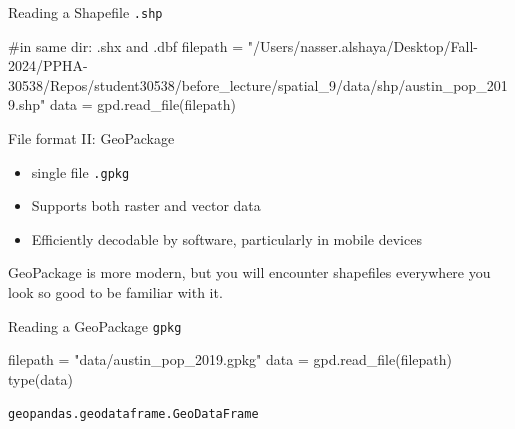 \documentclass[
  ignorenonframetext,
]{beamer}
\newenvironment{Shaded}{\begin{snugshade}}{\end{snugshade}}
\newcommand{\BuiltInTok}[1]{\textcolor[rgb]{0.00,0.23,0.31}{#1}}
\newcommand{\CommentTok}[1]{\textcolor[rgb]{0.37,0.37,0.37}{#1}}
\newcommand{\NormalTok}[1]{\textcolor[rgb]{0.00,0.23,0.31}{#1}}
\newcommand{\OperatorTok}[1]{\textcolor[rgb]{0.37,0.37,0.37}{#1}}
\newcommand{\StringTok}[1]{\textcolor[rgb]{0.13,0.47,0.30}{#1}}
\providecommand{\tightlist}{%
  \setlength{\itemsep}{0pt}\setlength{\parskip}{0pt}}\usepackage{longtable,booktabs,array}
\begin{document}
\begin{frame}[fragile]{Reading a Shapefile \texttt{.shp}}
\label{reading-a-shapefile-.shp}
\begin{Shaded}
\begin{Highlighting}[]
\CommentTok{\#in same dir:  \textasciigrave{}.shx\textasciigrave{} and \textasciigrave{}.dbf\textasciigrave{}}
\NormalTok{filepath }\OperatorTok{=} \StringTok{"/Users/nasser.alshaya/Desktop/Fall{-}2024/PPHA{-}30538/Repos/student30538/before\_lecture/spatial\_9/data/shp/austin\_pop\_2019.shp"}
\NormalTok{data }\OperatorTok{=}\NormalTok{ gpd.read\_file(filepath)}
\end{Highlighting}
\end{Shaded}
\end{frame}

\begin{frame}[fragile]{File format II: GeoPackage}
\label{file-format-ii-geopackage}
\begin{itemize}
\tightlist
\item
  single file \texttt{.gpkg}
\item
  Supports both raster and vector data
\item
  Efficiently decodable by software, particularly in mobile devices
\end{itemize}

GeoPackage is more modern, but you will encounter shapefiles everywhere
you look so good to be familiar with it.
\end{frame}

\begin{frame}[fragile]{Reading a GeoPackage \texttt{gpkg}}
\label{reading-a-geopackage-gpkg}
\begin{Shaded}
\begin{Highlighting}[]
\NormalTok{filepath }\OperatorTok{=} \StringTok{"data/austin\_pop\_2019.gpkg"}
\NormalTok{data }\OperatorTok{=}\NormalTok{ gpd.read\_file(filepath)}
\BuiltInTok{type}\NormalTok{(data)}
\end{Highlighting}
\end{Shaded}

\begin{verbatim}
geopandas.geodataframe.GeoDataFrame
\end{verbatim}
\end{frame}
\end{document}
